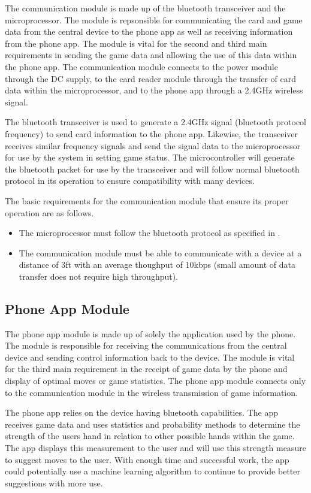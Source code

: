 \documentclass[12pt]{article}
\begin{document}
The communication module is made up of the bluetooth transceiver and the microprocessor. The module is repsonsible for communicating the card and game data from the central device to the phone app as well as receiving information from the phone app. The module is vital for the second and third main requirements in sending the game data and allowing the use of this data within the phone app. The communication module connects to the power module through the DC supply, to the card reader module through the transfer of card data within the microprocessor, and to the phone app through a 2.4GHz wireless signal.

The bluetooth transceiver is used to generate a 2.4GHz signal (bluetooth protocol frequency) to send card information to the phone app. Likewise, the transceiver receives similar frequency signals and send the signal data to the microprocessor for use by the system in setting game status. The microcontroller will generate the bluetooth packet for use by the transceiver and will follow normal bluetooth protocol in its operation to ensure compatibility with many devices.

The basic requirements for the communication module that ensure its proper operation are as follows.

\begin{itemize}
\item The microprocessor must follow the bluetooth protocol as specified in \cite{IEEE_bt}.
\item The communication module must be able to communicate with a device at a distance of 3ft with an average thoughput of 10kbps (small amount of data transfer does not require high throughput).
\end{itemize}

\subsection{Phone App Module}

The phone app module is made up of solely the application used by the phone. The module is responsible for receiving the communications from the central device and sending control information back to the device. The module is vital for the third main requirement in the receipt of game data by the phone and display of optimal moves or game statistics. The phone app module connects only to the communication module in the wireless transmission of game information.

The phone app relies on the device having bluetooth capabilities. The app receives game data and uses statistics and probability methods to determine the strength of the users hand in relation to other possible hands within the game. The app displays this measurement to the user and will use this strength measure to suggest moves to the user. With enough time and successful work, the app could potentially use a machine learning algorithm to continue to provide better suggestions with more use. 
\end{document}
